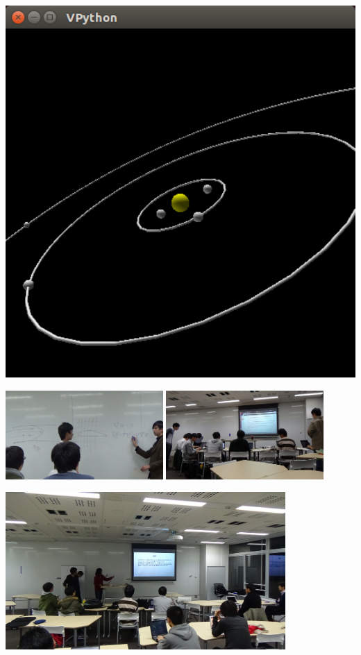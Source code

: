 \documentclass[10pt,dvipdfmx]{beamer}
\begin{document}
\begin{frame}
\begin{columns}
\begin{column}{0.4\textwidth}
\begin{center}
\begin{minipage}[t]{0.5\textwidth}
      \includegraphics[width=\textwidth]{out/pdf/img/solar_system.pdf}
    \end{minipage}

  \includegraphics[width=0.45\textwidth]{out/pdf/img/snap3.pdf}
    \hspace{0.2cm}\includegraphics[width=0.45\textwidth]{out/pdf/img/snap7.pdf}

    \hspace{0.5cm}\includegraphics[width=0.8\textwidth]{out/pdf/img/snap4.pdf}


\end{center}
\end{column}
\end{columns}
\end{frame}
\end{document}

